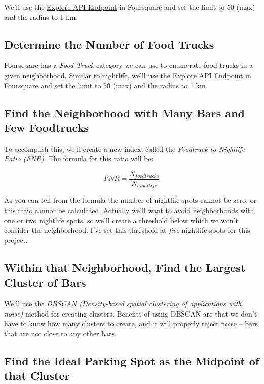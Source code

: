 \documentclass{deagle}
\begin{document}
We'll use the \href{https://developer.foursquare.com/docs/api-reference/venues/explore/}{Explore API Endpoint} in Foursquare and set the limit to 50 (max) and the radius to 1 km.

\subsection*{Determine the Number of Food Trucks}

Foursquare has a \emph{Food Truck} category we can use to enumerate food trucks in a given neighborhood. Similar to nightlife, we'll use the \href{https://developer.foursquare.com/docs/api-reference/venues/explore/}{Explore API Endpoint} in Foursquare and set the limit to 50 (max) and the radius to 1 km.

\subsection*{Find the Neighborhood with Many Bars and Few Foodtrucks}

To accomplish this, we'll create a new index, called the \emph{Foodtruck-to-Nightlife Ratio (FNR)}. The formula for this ratio will be:

\begin{equation}
	FNR = \frac{N_{foodtrucks}}{N_{nightlife}}
\end{equation}

As you can tell from the formula the number of nightlife spots cannot be zero, or this ratio cannot be calculated. Actually we'll want to avoid neighborhoods with one or two nightlife spots, so we'll create a threshold below which we won't consider the neighborhood. I've set this threshold at \emph{five} nightlife spots for this project.

\subsection*{Within that Neighborhood, Find the Largest Cluster of Bars}

We'll use the \emph{DBSCAN (Density-based spatial clustering of applications with noise)} method for creating clusters. Benefits of using DBSCAN are that we don't have to know how many clusters to create, and it will properly reject noise -- bars that are not close to any other bars.

\subsection*{Find the Ideal Parking Spot as the Midpoint of that Cluster}
\end{document}
